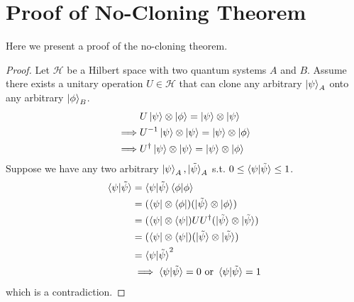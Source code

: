 \appendix
\appendixpage
\addappheadtotoc
\setcounter{equation}{0}
\renewcommand{\theequation}{A.\arabic{equation}}
\section{Proof of No-Cloning Theorem}
Here we present a proof of the no-cloning theorem.
\begin{proof}
    Let $\mathcal{H}$ be a Hilbert space with two quantum systems $A$ and $B$.
    Assume there exists a unitary operation $U\in\mathcal{H}$ that can clone any arbitrary $\ket{\psi}_A$ onto any arbitrary $\ket{\phi}_B$.
    \begin{align}
        &U\ket{\psi}\otimes\ket{\phi} = \ket{\psi}\otimes\ket{\psi}\\
        \implies &U^{-1}\ket{\psi}\otimes\ket{\psi} = \ket{\psi}\otimes\ket{\phi}\\
        \implies &U^{\dagger}\ket{\psi}\otimes\ket{\psi} = \ket{\psi}\otimes\ket{\phi}
    \end{align}
    Suppose we have any two arbitrary $\ket{\psi}_A,\ket{\tilde{\psi}}_A$ s.t. $0 \leq \braket{\psi|\tilde{\psi}} \leq 1$.
    \begin{align}
        \braket{\psi|\tilde{\psi}} & = \braket{\psi|\tilde{\psi}} \braket{\phi|\phi}\\
        & = (\bra{\psi}\otimes\bra{\phi})(\ket{\tilde{\psi}}\otimes\ket{\phi})\\
        & = (\bra{\psi}\otimes\bra{\psi})UU^{\dagger}(\ket{\tilde{\psi}}\otimes\ket{\tilde{\psi}})\\
        & = (\bra{\psi}\otimes\bra{\psi})(\ket{\tilde{\psi}}\otimes\ket{\tilde{\psi}})\\
        & = \braket{\psi|\tilde{\psi}}^2\\
        &\implies \braket{\psi|\tilde{\psi}} = 0 \text{ or } \braket{\psi|\tilde{\psi}} = 1
    \end{align}
    which is a contradiction.
\end{proof}